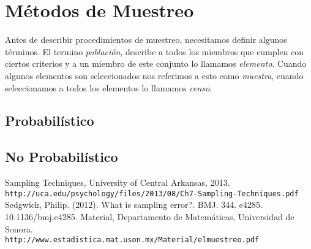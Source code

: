 \documentclass[10pt,letterpaper]{article}
\begin{document}
\section{Métodos de Muestreo}
Antes de describir procedimientos de muestreo, necesitamos definir algunos términos. El termino \textit{población}, describe a todos los miembros que cumplen con ciertos criterios y a un miembro de este conjunto lo llamamos \textit{elemento}. Cuando algunos elementos son seleccionados nos referimos a esto como \textit{muestra}, cuando seleccionamos a todos los elementos lo llamamos \textit{censo}.
\subsection{Probabilístico}
\subsection{No Probabilístico}

\begin{thebibliography}{9}
Sampling Techniques, University of Central Arkansas, 2013. \\\texttt{http://uca.edu/psychology/files/2013/08/Ch7-Sampling-Techniques.pdf}
Sedgwick, Philip. (2012). What is sampling error?. BMJ. 344. e4285. 10.1136/bmj.e4285. 
Material, Departamento de Matemáticas, Universidad de Sonora.\\\texttt{http://www.estadistica.mat.uson.mx/Material/elmuestreo.pdf}

\end{thebibliography}
\end{document}
